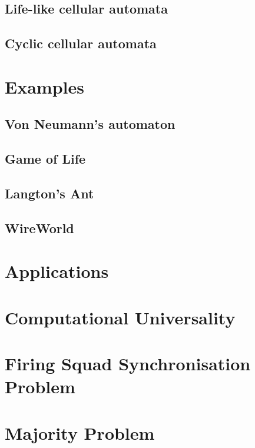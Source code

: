 \documentclass[11pt,a4paper]{article}
\begin{document}
    \subsection{Life-like cellular automata}

    \subsection{Cyclic cellular automata}

\section{Examples}
    \subsection{Von Neumann's automaton}
    \subsection{Game of Life}
    \subsection{Langton's Ant}
    \subsection{WireWorld}
\section{Applications}
\section{Computational Universality}
\section{Firing Squad Synchronisation Problem}
\section{Majority Problem}


\end{document}
